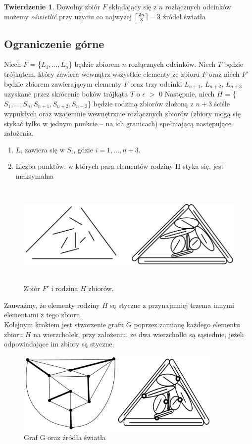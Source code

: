 \documentclass[brudnopis]{xmgr}
\DeclarePairedDelimiter\ceil{\lceil}{\rceil}
\theoremstyle{definition}
\newtheorem{Twierdzenie}{Twierdzenie}
\begin{document}
\begin{Twierdzenie} \cite{illumination}
 Dowolny zbiór $F$ składający się z $n$ rozłącznych odcinków możemy \emph{oświetlić} przy użyciu co najwyżej $\ceil{\frac{2n}{3}} - 3$ źródeł światła
\end{Twierdzenie}

\subsection{Ograniczenie górne}
\indent Niech $F$ = \{$L_1, \ldots, L_n$\} będzie zbiorem $n$ rozłącznych odcinków. Niech $T$ będzie trójkątem, który zawiera wewnątrz wszystkie elementy ze zbioru $F$ oraz niech $F'$ będzie zbiorem zawierającym elementy $F$ oraz trzy odcinki $L_{n+1}$, $L_{n+2}$, $L_{n+3}$ uzyskane przez skrócenie boków trójkąta $T$ o $\epsilon$ $>$ 0
Następnie, niech $H$ = \{$S_1,\ldots,S_n,S_{n+1},S_{n+2},S_{n+3}$\} będzie rodziną zbiorów złożoną z $n + 3$ ściśle wypukłych oraz wzajemnie wewnętrznie rozłącznych zbiorów (zbiory mogą się stykać tylko w jednym punkcie -- na ich granicach) spełniającą następujące założenia.
\begin{enumerate}
  \item $L_i$ zawiera się w $S_i$, gdzie $i = 1,\ldots,n+3$.
  \item Liczba punktów, w których para elementów rodziny H styka się, jest maksymalna
\end{enumerate}
\begin{figure}[ht!]
 \centering
  \includegraphics[height=5cm, width=13.5cm]{rysunki/podswietlenie.png}
  \caption{Zbiór $F'$ i rodzina $H$ zbiorów.}
\end{figure} 
Zauważmy, że elementy rodziny $H$ są styczne z przynajmniej trzema innymi elementami z tego zbioru. 
\\\indent Kolejnym krokiem jest stworzenie grafu $G$ poprzez zamianę każdego elementu zbioru $H$ na wierzchołek, przy założeniu, że dwa wierzchołki są sąsiednie, jeżeli odpowiadające im zbiory są styczne.
\begin{figure}[ht!]
 \centering
  \includegraphics[height=4cm]{rysunki/skojarzenia_zrodla_swiatla.png}
  \caption{Graf G oraz źródła światła}
\end{figure}
\end{document}
